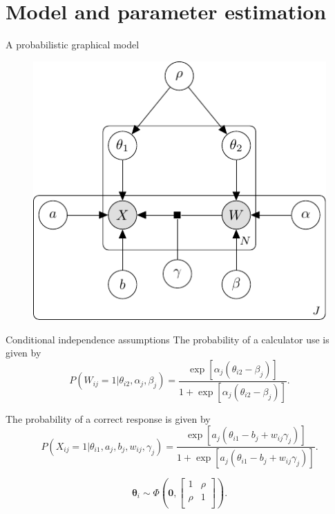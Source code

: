 \documentclass[xcolor=dvipsnames,12pt]{beamer}
\begin{document}
  \section{Model and parameter estimation}
  \begin{frame}{A probabilistic graphical model}
    \begin{figure}
      \includegraphics[scale = 0.8]{figures/joint_model_diagram.pdf}
    \end{figure}
  \end{frame}

  \begin{frame}{Conditional independence assumptions}
    The probability of a calculator use is given by
    \begin{equation*}
      P(W_{ij} = 1 | \theta_{i2}, \alpha_j, \beta_j) = \frac{\exp[\alpha_j 
      (\theta_{i2} - \beta_j)]}{1 + \exp[\alpha_j (\theta_{i2} - \beta_j)]}.
    \end{equation*}

    The probability of a correct response is given by
    \begin{equation*}
      P(X_{ij} = 1 | \theta_{i1}, a_j, b_j, w_{ij}, \gamma_j) = \frac{\exp[a_j
      (\theta_{i1} - b_j + w_{ij} \gamma_j)]}{1 + \exp[a_j(\theta_{i1} - b_j + w_
      {ij} \gamma_j)]}.
    \end{equation*}

    \begin{equation*}
      \bm{\theta}_i \sim \Phi\left(\bm{0}, 
      \begin{bmatrix}
      1 & \rho \\
      \rho & 1 \\
      \end{bmatrix}\right).
    \end{equation*}
  \end{frame}
\end{document}
